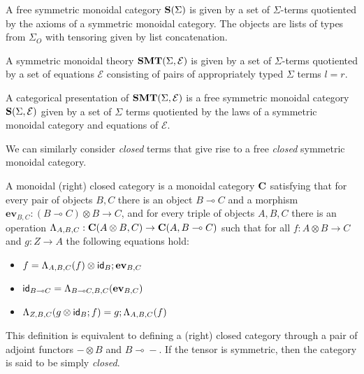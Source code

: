 \begin{definition}
A free symmetric monoidal category $\mathbf{S}(\Sigma)$ is given by a set of $\Sigma$-terms quotiented by the axioms of a symmetric monoidal category.
The objects are lists of types from $\Sigma_{O}$ with tensoring given by list concatenation.
\end{definition}

\begin{definition}
A symmetric monoidal theory $\mathbf{SMT}(\Sigma, \mathcal{E})$ is given by a set of $\Sigma$-terms quotiented by a set of equations $\mathcal{E}$ consisting of pairs of appropriately typed $\Sigma$ terms $l = r$.
\end{definition}

\begin{definition}
A categorical presentation of  $\mathbf{SMT}(\Sigma, \mathcal{E})$ is a free symmetric monoidal category $\mathbf{S}(\Sigma, \mathcal{E})$ given by a set of $\Sigma$ terms quotiented by the laws of a symmetric monoidal category and equations of $\mathcal{E}$.
\end{definition}

We can similarly consider \textit{closed} terms that give rise to a free \textit{closed} symmetric monoidal category.

\begin{definition}
\label{def:closed}
A monoidal (right) closed category is a monoidal category $\mathbf{C}$ satisfying that for
every pair of objects $B,C$ there is an object $B \multimap C$ and a morphism $\textbf{ev}_{B,C} : (B \multimap C) \otimes B \to
C$, and for every triple of objects $A,B,C$ there is an operation $\Lambda_{A,B,C} : \mathbf{C}(A \otimes B,C) \to
\mathbf{C}(A,B \multimap{} C)$ such that for all $f : A \otimes B \to C$ and $g : Z \to A$ the following equations hold:
\begin{itemize}
\item $f = \Lambda_{A,B,C}(f) \otimes \textsf{id}_{B}; \textbf{ev}_{B,C}$
\item $\textsf{id}_{B \multimap{} C} = \Lambda_{B \multimap{} C,B,C}(\textbf{ev}_{B,C})$
\item $\Lambda_{Z,B,C}(g \otimes \textsf{id}_{B}; f) = g;\Lambda_{A,B,C}(f)$
\end{itemize}
\end{definition}

This definition is equivalent to defining a (right) closed category through a pair of adjoint functors $- \otimes B$ and $B \multimap{} -$.
If the tensor is symmetric, then the category is said to be simply \textit{closed}.

